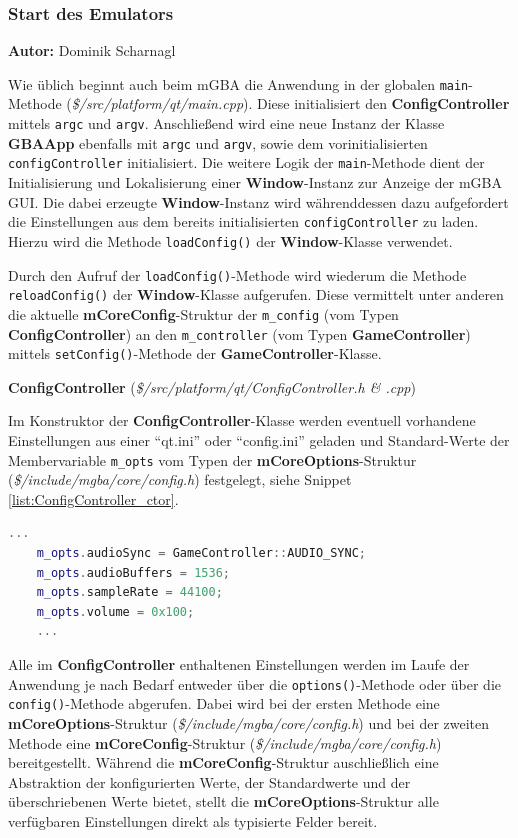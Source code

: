 \documentclass[11pt,a4paper]{scrartcl}
\newcommand{\AutorDominik} {
    \vspace{-4mm}
    \large \textbf{Autor:} Dominik Scharnagl \normalsize
    \vspace{2mm}
}
\newcommand{\paratitlecode}[2] {
    \vspace{5mm}
    \large \textbf{#1} \normalsize(\textit{\${#2}})
    \vspace{2mm}\newline
}
\begin{document}
\newpage
\subsubsection{Start des Emulators} \label{Emulator_Start}
\AutorDominik

Wie \"ublich beginnt auch beim mGBA die Anwendung in der globalen \verb|main|-Methode (\textit{\$/src/platform/qt/main.cpp}). Diese initialisiert den \textbf{ConfigController} mittels \verb|argc| und \verb|argv|. Anschlie{\ss}end wird eine neue Instanz der Klasse \textbf{GBAApp} ebenfalls mit \verb|argc| und \verb|argv|, sowie dem vorinitialisierten \verb|configController| initialisiert. Die weitere Logik der \verb|main|-Methode dient der Initialisierung und Lokalisierung einer \textbf{Window}-Instanz zur Anzeige der mGBA GUI. Die dabei erzeugte \textbf{Window}-Instanz wird w\"ahrenddessen dazu aufgefordert die Einstellungen aus dem bereits initialisierten \verb|configController| zu laden. Hierzu wird die Methode \verb|loadConfig()| der \textbf{Window}-Klasse verwendet.

Durch den Aufruf der \verb|loadConfig()|-Methode wird wiederum die Methode \verb|reloadConfig()| der \textbf{Window}-Klasse aufgerufen. Diese vermittelt unter anderen die aktuelle \textbf{mCoreConfig}-Struktur der \verb|m_config| (vom Typen \textbf{ConfigController}) an den \verb|m_controller| (vom Typen \textbf{GameController}) mittels \verb|setConfig()|-Methode der \textbf{GameController}-Klasse.

\paratitlecode{ConfigController}{/src/platform/qt/ConfigController.h \& .cpp}
Im Konstruktor der \textbf{ConfigController}-Klasse werden eventuell vorhandene Einstellungen aus einer \enquote{qt.ini} oder \enquote{config.ini} geladen und Standard-Werte der Membervariable \verb|m_opts| vom Typen der \textbf{mCoreOptions}-Struktur (\textit{\$/include/mgba/core/config.h}) festgelegt, siehe Snippet \ref{list:ConfigController_ctor}.

\vspace{5mm}
\begin{lstlisting}[language=C++, caption={Ausschnitt aus dem Konstruktor der ConfigController-Klasse}, label={list:ConfigController_ctor}]
    ...
	m_opts.audioSync = GameController::AUDIO_SYNC;
	m_opts.audioBuffers = 1536;
	m_opts.sampleRate = 44100;
	m_opts.volume = 0x100;
	...
\end{lstlisting}

Alle im \textbf{ConfigController} enthaltenen Einstellungen werden im Laufe der Anwendung je nach Bedarf entweder \"uber die \verb|options()|-Methode oder \"uber die \verb|config()|-Methode abgerufen. Dabei wird bei der ersten Methode eine \textbf{mCoreOptions}-Struktur (\textit{\$/include/mgba/core/config.h}) und bei der zweiten Methode eine \textbf{mCoreConfig}-Struktur (\textit{\$/include/mgba/core/config.h}) bereitgestellt. W\"ahrend die \textbf{mCoreConfig}-Struktur auschlie{\ss}lich eine Abstraktion der konfigurierten Werte, der Standardwerte und der \"uberschriebenen Werte bietet, stellt die \textbf{mCoreOptions}-Struktur alle verf\"ugbaren Einstellungen direkt als typisierte Felder bereit.
\end{document}
